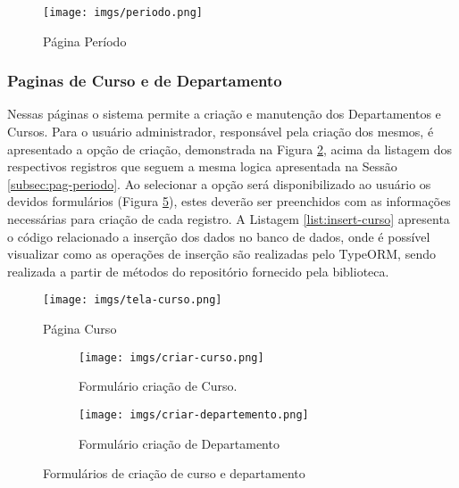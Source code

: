 \begin{figure}[h]
    \centering
    \texttt{[image: imgs/periodo.png]}
    \caption{Página Período}
    \label{fig:periodo}
\end{figure}



\newpage

\subsubsection{Paginas de Curso e de Departamento}

Nessas páginas o sistema permite a criação e manutenção dos Departamentos e Cursos. Para o usuário administrador, responsável pela criação dos mesmos, é apresentado a opção de criação, demonstrada na Figura \ref{fig:tela:curso}, acima da listagem dos respectivos registros que seguem a mesma logica apresentada na Sessão \ref{subsec:pag-periodo}. Ao selecionar a opção será disponibilizado ao usuário os devidos formulários (Figura \ref{fig:criacao:curso:dpto}), estes deverão ser preenchidos com as informações necessárias para criação de cada registro. A Listagem \ref{list:insert-curso} apresenta o código relacionado a inserção dos dados no banco de dados, onde é possível visualizar como as operações de inserção são realizadas pelo TypeORM, sendo realizada a partir de métodos do repositório fornecido pela biblioteca.

\begin{figure}[h]
    \centering
    \texttt{[image: imgs/tela-curso.png]}
    \caption{Página Curso}
    \label{fig:tela:curso}
\end{figure}


\begin{figure}[h]
    \centering
    \begin{subfigure}[h]{0.4\textwidth}
        \centering
        \texttt{[image: imgs/criar-curso.png]}
        \caption{Formulário criação de Curso.}
        \label{fig:card}
    \end{subfigure}
    \begin{subfigure}[h]{0.4\textwidth}
        \centering
        \texttt{[image: imgs/criar-departemento.png]}
        \caption{Formulário criação de Departamento}
        \label{fig:ccard1}
    \end{subfigure}
     \caption{Formulários de criação de curso e departamento}
    \label{fig:criacao:curso:dpto}
\end{figure}


